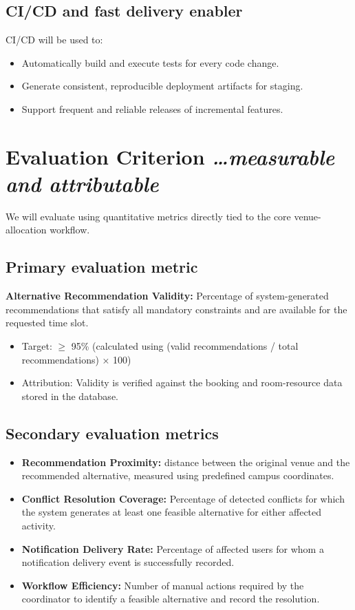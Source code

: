 \documentclass[11pt,a4paper]{article}
\newcommand{\BvrHint}[1]{%
  {\normalfont\normalsize\itshape\hfill #1}}
\begin{document}
\subsection{CI/CD and fast delivery enabler}
CI/CD will be used to:
\begin{itemize}[leftmargin=0.7cm]
    \item Automatically build and execute tests for every code change.
    \item Generate consistent, reproducible deployment artifacts for staging.
    \item Support frequent and reliable releases of incremental features.
\end{itemize}

\section{Evaluation Criterion %
\BvrHint{\ldots measurable and attributable}}
We will evaluate using quantitative metrics directly tied to the core venue-allocation workflow.

\subsection{Primary evaluation metric}
\textbf{Alternative Recommendation Validity:} Percentage of system-generated recommendations that satisfy all mandatory constraints and are available for the requested time slot.
\begin{itemize}[leftmargin=0.7cm]
    \item Target: $\geq$ 95\% (calculated using (valid recommendations / total recommendations) × 100)
    \item Attribution: Validity is verified against the booking and room-resource data stored in the database.
\end{itemize}

\subsection{Secondary evaluation metrics}
\begin{itemize}[leftmargin=0.7cm]
    \item \textbf{Recommendation Proximity:} distance between the original venue and the recommended alternative, measured using predefined campus coordinates.
    \item \textbf{Conflict Resolution Coverage:} Percentage of detected conflicts for which the system generates at least one feasible alternative for either affected activity.
    \item \textbf{Notification Delivery Rate:} Percentage of affected users for whom a notification delivery event is successfully recorded.
    \item \textbf{Workflow Efficiency:} Number of manual actions required by the coordinator to identify a feasible alternative and record the resolution.
\end{itemize}
\end{document}
